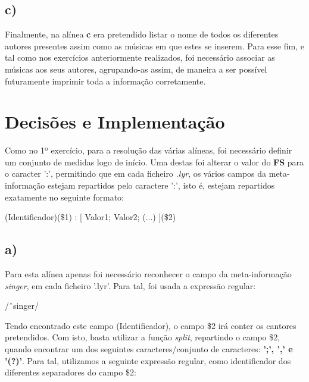 \documentclass[12pt,a4paper]{report}
\begin{document}
\subsection{c)}
Finalmente, na alínea \textbf{c} era pretendido listar o nome de todos os diferentes autores presentes assim como as músicas em que estes se inserem. Para esse fim, e tal como nos exercícios anteriormente realizados, foi necessário associar as músicas aos seus autores, agrupando-as assim, de maneira a ser possível futuramente imprimir toda a informação corretamente.

\section{Decisões e Implementação}
Como no 1º exercício, para a resolução das várias alíneas, foi necessário definir um conjunto de medidas logo de início. Uma destas foi alterar o valor do \textbf{FS} para o caracter ':', permitindo que em cada ficheiro \emph{.lyr}, os vários campos da meta-informação estejam repartidos pelo caractere ':', isto é, estejam repartidos exatamente no seguinte formato: \par
\vspace{0.6cm}

\begin{center}
(Identificador)(\$1) : [ Valor1; Valor2; (...) ](\$2)
\end{center}

\subsection{a)}
Para esta alínea apenas foi necessário reconhecer o campo da meta-informação \emph{singer}, em cada ficheiro '.lyr'. Para tal, foi usada a expressão regular: \par

\begin{center}
\vspace{0.3cm}
/\^\ singer/ \par
\vspace{0.3cm}
\end{center}

\noindent Tendo encontrado este campo (Identificador), o campo \$2 irá conter os cantores pretendidos. Com isto, basta utilizar a função \emph{split}, repartindo o campo \$2, quando encontrar um dos seguintes caracteres/conjunto de caracteres: \textbf{';', ',' e '(?)'}. Para tal, utilizamos a seguinte expressão regular, como identificador dos diferentes separadores do campo \$2: \par
\end{document}
